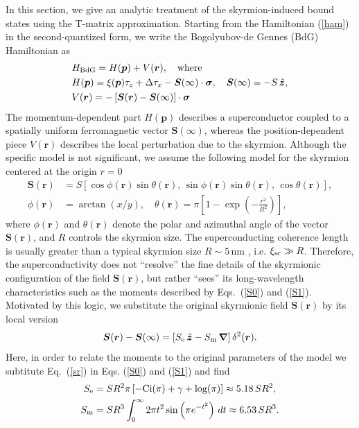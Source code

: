 \documentclass[twocolumn,showpacs,floatfix,nofootinbib,longbibliography]{revtex4-1}
\begin{document}
In this section, we give an analytic treatment of the skyrmion-induced bound states using the T-matrix approximation. Starting from the Hamiltonian (\ref{ham}) in the second-quantized form, we write the Bogolyubov-de Gennes (BdG) Hamiltonian as
\begin{align}
	& H_{\rm BdG} = H(\bm p) + V(\bm r),\quad {\rm where} \nonumber \\
& H(\bm p) = \xi(\bm p)\tau_z+\Delta \tau_x - \bm S(\infty)\cdot\bm\sigma,\quad \bm S(\infty) = -S\,\hat{\bm z}, \nonumber\\
& V(\bm r) = -\left[ \bm S(\bm r)-\bm S(\infty)\right]\cdot\bm\sigma \label{v0}
\end{align}
The momentum-dependent part $H(\bm p)$ describes a superconductor coupled to a spatially uniform ferromagnetic vector $\bm S(\infty)$, whereas the position-dependent piece $V(\bm r)$ describes the local perturbation due to the skyrmion. Although the specific model is not significant, we assume the following model for the skyrmion centered at the origin $r=0$
\begin{align}
	\bm S(\bm r) &= S\left[ \cos\phi(\bm r) \sin\theta(\bm r),\, \sin\phi(\bm r)\sin\theta(\bm r),\,\cos\theta(\bm r)\right], \nonumber \\
	\phi(\bm r) &= \arctan(x/y),\quad \theta(\bm r) = \pi \left[ 1-\exp\left( -\frac{r^2}{R^2} \right) \right], 	\label{sr}
\end{align}
where $\phi(\bm r)$ and $\theta(\bm r)$ denote the polar and azimuthal angle of the vector $\bm S(\bm r)$, and $R$ controls the skyrmion size. The superconducting coherence length is usually greater than a typical skyrmion size $R\sim 5$\,nm \cite{Heinze2011,Romming2013,Bergmann2014,Brede2014,Sonntag2014,vonBergmann2015,Romming2015}, i.e. $\xi_{\rm sc}\gg R$. Therefore, the superconductivity does not ``resolve'' the fine details of the skyrmionic configuration of the field  $\bm S(\bm r)$, but rather ``sees'' its long-wavelength characteristics such as the moments described by Eqs.~(\ref{S0}) and (\ref{S1}). Motivated by this logic, we substitute the original skyrmionic field $\bm S(\bm r)$ by its local version
\begin{equation}
	\bm S(\bm r) - \bm S(\infty) = \left[ S_{\rm e}\, \hat{\bm z} - S_{\rm m}\, \bm \nabla\right] \delta^2(\bm r).
	\label{S}
\end{equation}
Here, in order to relate the moments to the original parameters of the model we subtitute Eq.~(\ref{sr}) in Eqs. (\ref{S0}) and (\ref{S1}) and find
\begin{align}
	S_{\rm e} &= SR^2 \pi  \left [-\text{Ci}(\pi )+\gamma +\log (\pi )\right] \approx 5.18\, SR^2, \\
	S_{\rm m} &= SR^3 \int_0^{\infty } 2 \pi  t^2 \sin \left(\pi  e^{-t^2}\right) \, dt \approx 6.53\, SR^3.
\end{align}
\end{document}
